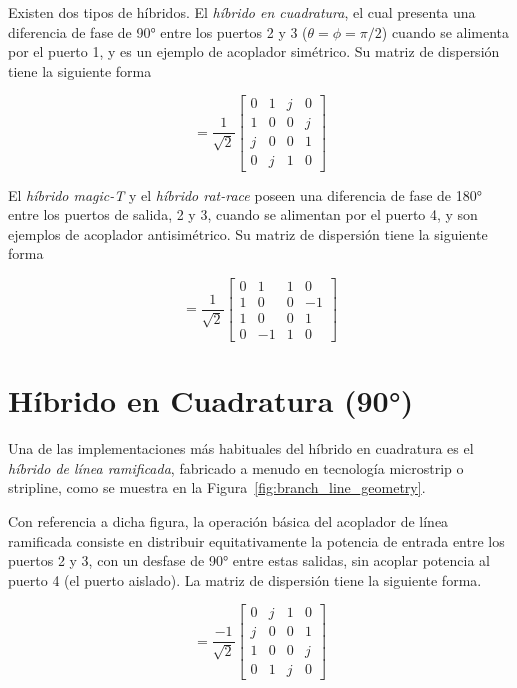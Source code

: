 Existen dos tipos de híbridos. El \textit{híbrido en cuadratura}, el cual presenta una diferencia de fase de 90° entre los puertos 2 y 3 ($\theta = \phi = \pi/2$) cuando se alimenta por el puerto 1, y es un ejemplo de acoplador simétrico. Su matriz de dispersión tiene la siguiente forma

\begin{equation}
    [S] = \frac{1}{\sqrt{2}} 
    \begin{bmatrix} 
        0 & 1 & j & 0 \\ 
        1 & 0 & 0 & j \\ 
        j & 0 & 0 & 1 \\ 
        0 & j & 1 & 0 
    \end{bmatrix}
    \label{eq:quadrature_hybrid}
\end{equation}

El \textit{híbrido magic-T} y el \textit{híbrido rat-race} poseen una diferencia de fase de 180° entre los puertos de salida, 2 y 3, cuando se alimentan por el puerto 4, y son ejemplos de acoplador antisimétrico. Su matriz de dispersión tiene la siguiente forma

\begin{equation}
    [S] = \frac{1}{\sqrt{2}} 
    \begin{bmatrix} 
        0 & 1  & 1 & 0  \\ 
        1 & 0  & 0 & -1 \\ 
        1 & 0  & 0 & 1  \\ 
        0 & -1 & 1 & 0 
    \end{bmatrix}
    \label{eq:antisymmetric_hybrid}
\end{equation}

\section{Híbrido en Cuadratura (90°)}
Una de las implementaciones más habituales del híbrido en cuadratura es el \textit{híbrido de línea ramificada}, fabricado a menudo en tecnología microstrip o stripline, como se muestra en la Figura~\ref{fig:branch_line_geometry}.

Con referencia a dicha figura, la operación básica del acoplador de línea ramificada consiste en distribuir equitativamente la potencia de entrada entre los puertos 2 y 3, con un desfase de 90° entre estas salidas, sin acoplar potencia al puerto 4 (el puerto aislado). La matriz de dispersión tiene la siguiente forma.

\begin{equation}
    [S] = \frac{-1}{\sqrt{2}} 
    \begin{bmatrix}
        0 & j & 1 & 0 \\
        j & 0 & 0 & 1 \\
        1 & 0 & 0 & j \\
        0 & 1 & j & 0
    \end{bmatrix}
    \label{eq:quadrature_scattering}
\end{equation}

